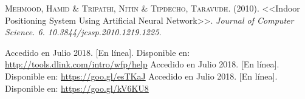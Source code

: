 \begin{thebibliography}{X}
 \textsc{Mehmood, Hamid & Tripathi, Nitin & Tipdecho, Taravudh. (2010)}. <<Indoor Positioning System Using Artificial Neural Network>>. \textit{Journal of Computer Science. 6. 10.3844/jcssp.2010.1219.1225.}

 Accedido en Julio 2018. [En línea]. Disponible en: \url{http://tools.dlink.com/intro/wfp/help} \label{fig:prop}
 Accedido en Julio 2018. [En línea]. Disponible en: \url{https://goo.gl/esTKaJ} \label{fig:paginaHP}
 Accedido en Julio 2018. [En línea]. Disponible en: \url{https://goo.gl/kV6KU8}

\end{thebibliography}
